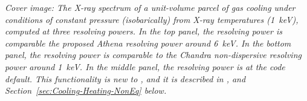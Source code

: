 \documentclass[12pt]{book}
\begin{document}
\clearpage

\vspace{5mm}
\noindent
{\small
{\em Cover image:
The X-ray spectrum of a unit-volume parcel of gas cooling under conditions
of constant pressure (isobarically) from X-ray temperatures (1~keV), computed
at three resolving powers.
In the top panel, the resolving power is comparable the proposed {\it Athena}
resolving power around 6~keV.
In the bottom panel, the resolving power is comparable to the {\it Chandra}
non-dispersive resolving power around 1~keV.
In the middle panel, the resolving power is at the code default.
This functionality is new to \Cloudy, and it is described in
\citet{Chatzikos2015}, and Section~\ref{sec:Cooling-Heating-NonEq} below.
}
}
\clearpage

\tableofcontents
\listoffigures
\listoftables

\clearpage
\mainmatter
      
     
   
   
   
   
     
    
   
   
      
      
      

   
     
   
       
    
\appendix



\backmatter


\end{document}
